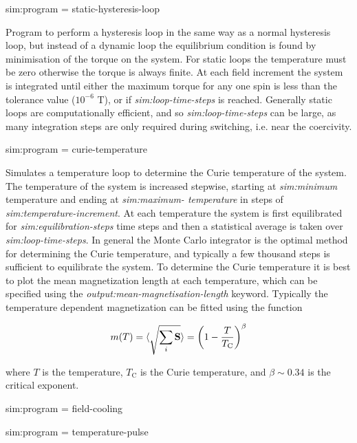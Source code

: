 {\zicf sim:program = static-hysteresis-loop} Program to perform a hysteresis loop in the same way as a normal hysteresis loop, but instead of a dynamic loop the equilibrium condition is found by minimisation of the torque on the system. For static loops the temperature must be zero otherwise the torque is always finite. At each field increment the system is integrated until either the maximum torque for any one spin is less than the tolerance value ($10^{-6}$ T), or if \textit{sim:loop-time-steps} is reached. Generally static loops are computationally efficient, and so \textit{sim:loop-time-steps} can be large, as many integration steps are only required during switching, i.e. near the coercivity.

{\zicf sim:program = curie-temperature} Simulates a temperature loop to determine the Curie temperature of the system. The temperature of the system is increased stepwise, starting at \textit{sim:minimum} temperature and ending at \textit{sim:maximum- temperature} in steps of \textit{sim:temperature-increment}. At each temperature the system is first equilibrated for \textit{sim:equilibration-steps} time steps and then a statistical average is taken over \textit{sim:loop-time-steps}. In general the Monte Carlo integrator is the optimal method for determining the Curie temperature, and typically a few thousand steps is sufficient to equilibrate the system. To determine the Curie temperature it is best to plot the mean magnetization length at each temperature, which can be specified using the \textit{output:mean-magnetisation-length} keyword. Typically the temperature dependent magnetization can be fitted using the function

\begin{equation}
m(T) = \langle{\sqrt{\sum_i \mathbf{S}}}\rangle = \left(1 - \frac{T}{T_{\mathrm{C}}} \right)^{\beta}
\end{equation}

\noindent where $T$ is the temperature, $T_{\mathrm{C}}$ is the Curie temperature, and $\beta \sim 0.34$ is the critical exponent.

{\zicf sim:program = field-cooling}

{\zicf sim:program = temperature-pulse}

